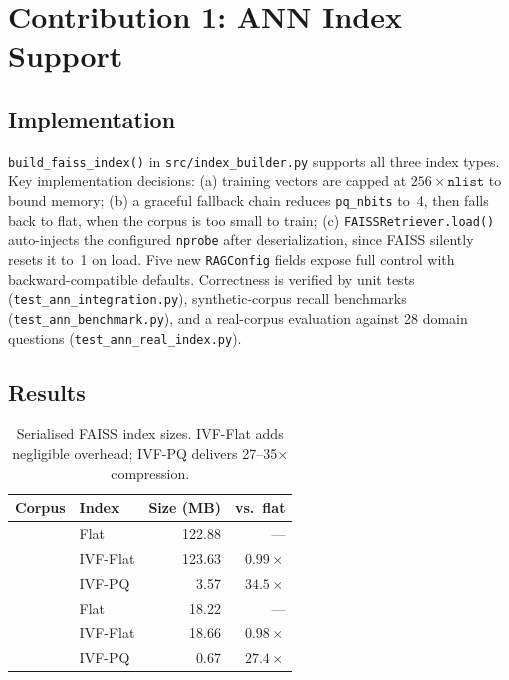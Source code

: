 \documentclass[11pt,letterpaper]{article}
\begin{document}
\section{Contribution 1: ANN Index Support}

\subsection{Implementation}

\texttt{build\_faiss\_index()} in \texttt{src/index\_builder.py} supports all three
index types. Key implementation decisions: (a) training vectors are capped at
$256 \times \texttt{nlist}$ to bound memory; (b) a graceful fallback chain reduces
\texttt{pq\_nbits} to~4, then falls back to flat, when the corpus is too small to
train; (c) \texttt{FAISSRetriever.load()} auto-injects the configured \texttt{nprobe}
after deserialization, since FAISS silently resets it to~1 on load.
Five new \texttt{RAGConfig} fields expose full control with backward-compatible defaults.
Correctness is verified by unit tests (\texttt{test\_ann\_integration.py}),
synthetic-corpus recall benchmarks (\texttt{test\_ann\_benchmark.py}), and a
real-corpus evaluation against 28 domain questions (\texttt{test\_ann\_real\_index.py}).

\subsection{Results}

\begin{table}[H]
\centering
\caption{Serialised FAISS index sizes. IVF-Flat adds negligible overhead; IVF-PQ delivers 27--35$\times$ compression.}
\label{tab:sizes}
\setlength{\tabcolsep}{8pt}
\begin{tabular}{llrr}
\toprule
Corpus & Index & Size (MB) & vs.\ flat \\
\midrule
{}
  & Flat     & 122.88 & --- \\
  & IVF-Flat & 123.63 & $0.99\times$ \\
  & IVF-PQ   &   3.57 & $\mathbf{34.5\times}$ \\
\midrule
{}
  & Flat     &  18.22 & --- \\
  & IVF-Flat &  18.66 & $0.98\times$ \\
  & IVF-PQ   &   0.67 & $\mathbf{27.4\times}$ \\
\bottomrule
\end{tabular}
\end{table}
\end{document}
